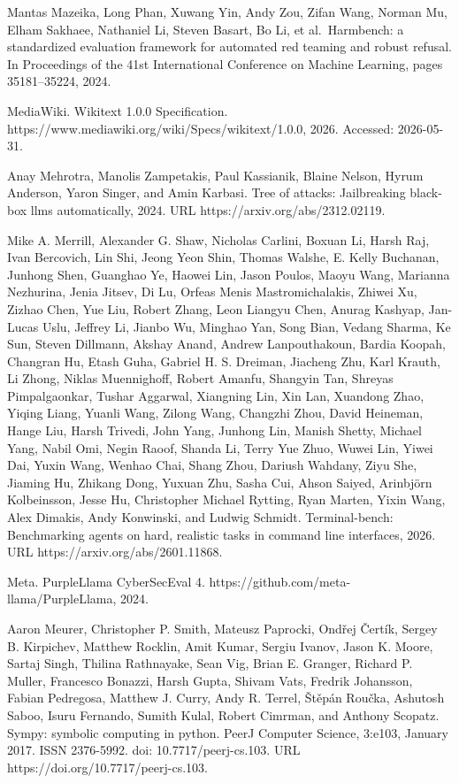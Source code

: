 Mantas Mazeika, Long Phan, Xuwang Yin, Andy Zou, Zifan Wang, Norman Mu,
Elham Sakhaee, Nathaniel Li, Steven Basart, Bo Li, et al.~Harmbench: a
standardized evaluation framework for automated red teaming and robust
refusal. In Proceedings of the 41st International Conference on Machine
Learning, pages 35181--35224, 2024.



MediaWiki. Wikitext 1.0.0 Specification.
https://www.mediawiki.org/wiki/Specs/wikitext/1.0.0, 2026. Accessed:
2026-05-31.

Anay Mehrotra, Manolis Zampetakis, Paul Kassianik, Blaine Nelson, Hyrum
Anderson, Yaron Singer, and Amin Karbasi. Tree of attacks: Jailbreaking
black-box llms automatically, 2024. URL https://arxiv.org/abs/2312.02119.

Mike A. Merrill, Alexander G. Shaw, Nicholas Carlini, Boxuan Li, Harsh
Raj, Ivan Bercovich, Lin Shi, Jeong Yeon Shin, Thomas Walshe, E. Kelly
Buchanan, Junhong Shen, Guanghao Ye, Haowei Lin, Jason Poulos, Maoyu
Wang, Marianna Nezhurina, Jenia Jitsev, Di Lu, Orfeas Menis
Mastromichalakis, Zhiwei Xu, Zizhao Chen, Yue Liu, Robert Zhang, Leon
Liangyu Chen, Anurag Kashyap, Jan-Lucas Uslu, Jeffrey Li, Jianbo Wu,
Minghao Yan, Song Bian, Vedang Sharma, Ke Sun, Steven Dillmann, Akshay
Anand, Andrew Lanpouthakoun, Bardia Koopah, Changran Hu, Etash Guha,
Gabriel H. S. Dreiman, Jiacheng Zhu, Karl Krauth, Li Zhong, Niklas
Muennighoff, Robert Amanfu, Shangyin Tan, Shreyas Pimpalgaonkar, Tushar
Aggarwal, Xiangning Lin, Xin Lan, Xuandong Zhao, Yiqing Liang, Yuanli
Wang, Zilong Wang, Changzhi Zhou, David Heineman, Hange Liu, Harsh
Trivedi, John Yang, Junhong Lin, Manish Shetty, Michael Yang, Nabil Omi,
Negin Raoof, Shanda Li, Terry Yue Zhuo, Wuwei Lin, Yiwei Dai, Yuxin
Wang, Wenhao Chai, Shang Zhou, Dariush Wahdany, Ziyu She, Jiaming Hu,
Zhikang Dong, Yuxuan Zhu, Sasha Cui, Ahson Saiyed, Arinbjörn
Kolbeinsson, Jesse Hu, Christopher Michael Rytting, Ryan Marten, Yixin
Wang, Alex Dimakis, Andy Konwinski, and Ludwig Schmidt. Terminal-bench:
Benchmarking agents on hard, realistic tasks in command line interfaces,
2026. URL https://arxiv.org/abs/2601.11868.

Meta. PurpleLlama CyberSecEval 4.
https://github.com/meta-llama/PurpleLlama, 2024.

Aaron Meurer, Christopher P. Smith, Mateusz Paprocki, Ondřej Čertík,
Sergey B. Kirpichev, Matthew Rocklin, Amit Kumar, Sergiu Ivanov, Jason
K. Moore, Sartaj Singh, Thilina Rathnayake, Sean Vig, Brian E. Granger,
Richard P. Muller, Francesco Bonazzi, Harsh Gupta, Shivam Vats, Fredrik
Johansson, Fabian Pedregosa, Matthew J. Curry, Andy R. Terrel, Štěpán
Roučka, Ashutosh Saboo, Isuru Fernando, Sumith Kulal, Robert Cimrman,
and Anthony Scopatz. Sympy: symbolic computing in python. PeerJ Computer
Science, 3:e103, January 2017. ISSN 2376-5992. doi:
10.7717/peerj-cs.103. URL https://doi.org/10.7717/peerj-cs.103.

